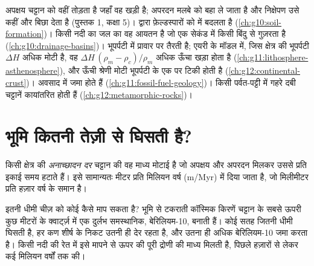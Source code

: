 \begin{recall}
अपक्षय चट्टान को वहीं तोड़ता है जहाँ वह खड़ी है; अपरदन मलबे को बहा ले जाता है
और निक्षेपण उसे कहीं और बिछा देता है (पुस्तक 1, कक्षा 5)। 
 द्वारा फ़ेल्डस्पारों को  में बदलता है
(\cref{ch:g10:soil-formation})। किसी नदी का  जल का वह आयतन है
जो एक सेकंड में किसी बिंदु से गुज़रता है (\cref{ch:g10:drainage-basins})।
भूपर्पटी  में प्रावार पर तैरती है; एयरी के मॉडल में, जिस क्षेत्र की भूपर्पटी
$\Delta H$ अधिक मोटी है, वह $\Delta H\,(\rho_m - \rho_c)/\rho_m$ अधिक ऊँचा खड़ा होता है
(\cref{ch:g11:lithosphere-asthenosphere}), और ऊँची श्रेणी मोटी भूपर्पटी के एक 
पर टिकी होती है (\cref{ch:g12:continental-crust})। अवसाद
 में जमा होते हैं (\cref{ch:g11:fossil-fuel-geology})। किसी पर्वत-पट्टी में
गहरे दबी चट्टानें कायांतरित होती हैं (\cref{ch:g12:metamorphic-rocks})।
\end{recall}

\section{भूमि कितनी तेज़ी से घिसती है?}

\begin{definition}[अनाच्छादन दर]\label{def:g12:destruction-of-mountains:denudation}
किसी क्षेत्र की \emph{अनाच्छादन दर} चट्टान की वह माध्य
मोटाई है जो अपक्षय और अपरदन मिलकर उससे प्रति इकाई समय हटाते
हैं। इसे सामान्यतः मीटर प्रति मिलियन वर्ष
(\unit{m/Myr}) में दिया जाता है, जो मिलीमीटर प्रति हज़ार वर्ष के समान है।
\end{definition}

इतनी धीमी चीज़ को कोई कैसे माप सकता है? भूमि से टकराती कॉस्मिक किरणें
चट्टान के सबसे ऊपरी कुछ मीटरों के क्वार्ट्ज़ में एक दुर्लभ समस्थानिक, बेरिलियम-10, बनाती हैं।
कोई सतह जितनी धीमी घिसती है, हर कण शीर्ष के निकट उतनी ही देर रहता है,
और उतना ही अधिक बेरिलियम-10 जमा करता है। किसी नदी की रेत में इसे मापने से
ऊपर की पूरी द्रोणी की माध्य  मिलती है, पिछले
हज़ारों से लेकर कई मिलियन वर्षों तक की।

